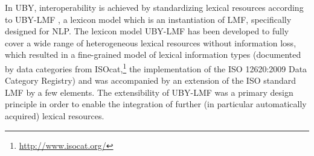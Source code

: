 In UBY, interoperability is achieved by standardizing lexical resources according
to UBY-LMF \cite{ecklekohler2012uby,TUD-CS-2013-0003}, a lexicon
model which is an instantiation of 
LMF, specifically designed for NLP.
The lexicon model UBY-LMF has been developed to fully cover a wide range of heterogeneous lexical resources
without information loss, which resulted in a fine-grained model of lexical information types (documented by
data categories from ISOcat,\footnote{\url{http://www.isocat.org/}} 
 the implementation of the ISO 12620:2009 Data Category Registry)
 and was accompanied by
an extension of the ISO standard LMF by a few elements.
The extensibility of UBY-LMF was a primary design principle in order to enable the integration of further 
(in particular automatically acquired) lexical resources. %





